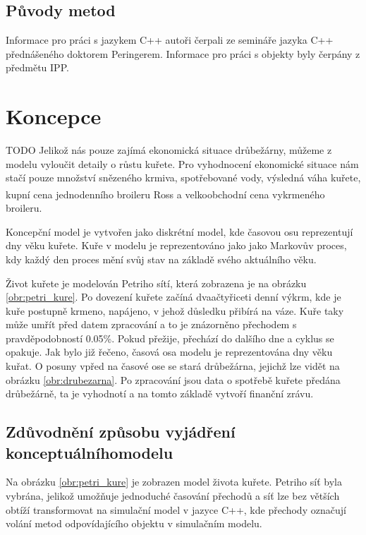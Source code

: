 \documentclass[a4paper,10pt]{article}
\begin{document}
\subsection{Původy metod}\label{puvod}
Informace pro práci s jazykem C++ autoři čerpali ze semináře jazyka C++\cite{cpp}
přednášeného doktorem Peringerem. Informace pro práci s objekty byly čerpány
z předmětu IPP\cite{ipp}.





\section{Koncepce}\label{koncepce}
TODO
Jelikož nás pouze zajímá ekonomická situace drůbežárny, můžeme z modelu vyloučit detaily
o růstu kuřete. Pro vyhodnocení ekonomické situace nám stačí pouze množství snězeného krmiva,
spotřebované vody, výsledná váha kuřete, kupní cena jednodenního broileru Ross\textsuperscript\textregistered
a velkoobchodní cena vykrmeného broileru.
\par
Koncepční model\cite{concept_model} je vytvořen jako diskrétní model, kde časovou osu reprezentují dny věku kuřete.
Kuře v modelu je reprezentováno jako jako Markovův proces\cite{markovuv_proces},
kdy každý den proces mění svůj stav na základě svého aktuálního věku.
\par
Život kuřete je modelován Petriho sítí, která zobrazena je na obrázku \ref{obr:petri_kure}.
Po dovezení kuřete začíná dvaačtyřiceti denní výkrm, kde je kuře postupně krmeno, napájeno, v jehož důsledku
přibírá na váze. Kuře taky může umřít před datem zpracování a to je znázorněno přechodem\cite{prechod} s pravděpodobností 0.05\%.
Pokud přežije, přechází do dalšího dne a cyklus se opakuje. Jak bylo již řečeno, časová osa modelu je reprezentována dny
věku kuřat. O posuny vpřed na časové ose se stará drůbežárna, jejichž lze vidět na obrázku \ref{obr:drubezarna}. 
Po zpracování jsou data o spotřebě kuřete předána drůbežárně, ta je vyhodnotí a na tomto základě vytvoří finanční zrávu.

\subsection{Zdůvodnění způsobu vyjádření konceptuálního\newline modelu}
Na obrázku \ref{obr:petri_kure} je zobrazen model života kuřete. Petriho síť byla vybrána, jelikož umožňuje
jednoduché časování přechodů a síť lze bez větších obtíží transformovat na simulační model v jazyce C++, kde přechody
označují volání metod odpovídajícího objektu v simulačním modelu.
\end{document}
